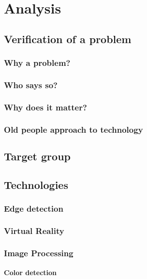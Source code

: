 \chapter{Analysis}
	
	
	\section{Verification of a problem}\label{sec:verification}
		\subsection{Why a problem?}
		
		\subsection{Who says so?}
		
		\subsection{Why does it matter?}
		
		\subsection{Old people approach to technology}

	\section{Target group}\label{sec:targetGroup}

	\section{Technologies}\label{sec:technologies}
		\subsection{Edge detection}
		\subsection{Virtual Reality}
		\subsection{Image Processing}
			\subsubsection{Color detection}
